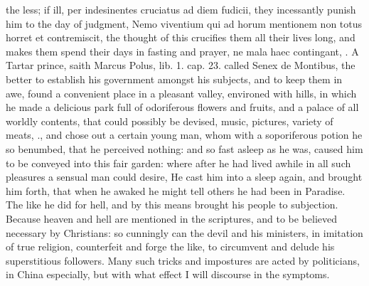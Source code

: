 {the less; if ill, per indesinentes cruciatus ad diem fudicii, they
incessantly punish him to the day of judgment, Nemo viventium qui ad
horum mentionem non totus horret et contremiscit, the thought of this
crucifies them all their lives long, and makes them spend their days in
fasting and prayer, ne mala haec contingant, \etc{}. A Tartar prince, saith
Marcus Polus, lib. 1. cap. 23. called Senex de Montibus, the better to
establish his government amongst his subjects, and to keep them in awe,
found a convenient place in a pleasant valley, environed with hills, in
which he made a delicious park full of odoriferous flowers and
fruits, and a palace of all worldly contents, that could possibly be
devised, music, pictures, variety of meats, \etc{}., and chose out a
certain young man, whom with a soporiferous potion he so
benumbed, that he perceived nothing: and so fast asleep as he was,
caused him to be conveyed into this fair garden: where after he had
lived awhile in all such pleasures a sensual man could desire, He
cast him into a sleep again, and brought him forth, that when he awaked
he might tell others he had been in Paradise. The like he did for hell,
and by this means brought his people to subjection. Because heaven and
hell are mentioned in the scriptures, and to be believed necessary by
Christians: so cunningly can the devil and his ministers, in imitation
of true religion, counterfeit and forge the like, to circumvent and
delude his superstitious followers. Many such tricks and impostures are
acted by politicians, in China especially, but with what effect I will
discourse in the symptoms.

}
